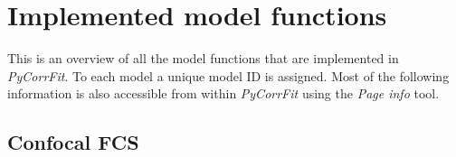 \section{Implemented model functions}
\label{sec:imple}
This is an overview of all the model functions that are  implemented in \textit{PyCorrFit}. To each model a unique model ID is assigned. Most of the following information is also accessible from within \textit{PyCorrFit} using the \textit{Page info} tool.

\subsection{Confocal FCS}
\label{sec:imple.confo}





